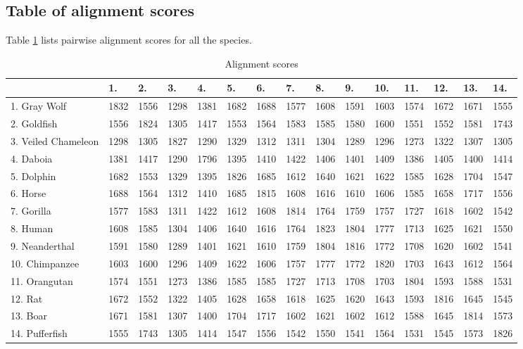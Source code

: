 \documentclass[a4paper,11pt]{article}
\begin{document}
\subsection{Table of alignment scores}
Table \ref{scores} lists pairwise alignment scores for all the species.
\begin{table}[htbp,resetmargins=true]
\footnotesize
\caption{Alignment scores}
\label{scores}
\begin{center}
\begin{tabular}{@{}lllllllllllllll@{}}
\hline
 & 1.  & 2.  & 3.  & 4.  & 5.  & 6.  & 7.  & 8.  & 9.  & 10.  & 11.  & 12.  & 13.  & 14.\\
\hline

1. Gray Wolf & 1832 & 1556 & 1298 & 1381 & 1682 & 1688 & 1577 & 1608 & 1591 & 1603 & 1574 & 1672 & 1671 & 1555\\
2. Goldfish & 1556 & 1824 & 1305 & 1417 & 1553 & 1564 & 1583 & 1585 & 1580 & 1600 & 1551 & 1552 & 1581 & 1743\\
3. Veiled Chameleon & 1298 & 1305 & 1827 & 1290 & 1329 & 1312 & 1311 & 1304 & 1289 & 1296 & 1273 & 1322 & 1307 & 1305\\
4. Daboia & 1381 & 1417 & 1290 & 1796 & 1395 & 1410 & 1422 & 1406 & 1401 & 1409 & 1386 & 1405 & 1400 & 1414\\
5. Dolphin & 1682 & 1553 & 1329 & 1395 & 1826 & 1685 & 1612 & 1640 & 1621 & 1622 & 1585 & 1628 & 1704 & 1547\\
6. Horse & 1688 & 1564 & 1312 & 1410 & 1685 & 1815 & 1608 & 1616 & 1610 & 1606 & 1585 & 1658 & 1717 & 1556\\
7. Gorilla & 1577 & 1583 & 1311 & 1422 & 1612 & 1608 & 1814 & 1764 & 1759 & 1757 & 1727 & 1618 & 1602 & 1542\\
8. Human & 1608 & 1585 & 1304 & 1406 & 1640 & 1616 & 1764 & 1823 & 1804 & 1777 & 1713 & 1625 & 1621 & 1550\\
9. Neanderthal & 1591 & 1580 & 1289 & 1401 & 1621 & 1610 & 1759 & 1804 & 1816 & 1772 & 1708 & 1620 & 1602 & 1541\\
10. Chimpanzee & 1603 & 1600 & 1296 & 1409 & 1622 & 1606 & 1757 & 1777 & 1772 & 1820 & 1703 & 1643 & 1612 & 1564\\
11. Orangutan & 1574 & 1551 & 1273 & 1386 & 1585 & 1585 & 1727 & 1713 & 1708 & 1703 & 1804 & 1593 & 1588 & 1531\\
12. Rat & 1672 & 1552 & 1322 & 1405 & 1628 & 1658 & 1618 & 1625 & 1620 & 1643 & 1593 & 1816 & 1645 & 1545\\
13. Boar & 1671 & 1581 & 1307 & 1400 & 1704 & 1717 & 1602 & 1621 & 1602 & 1612 & 1588 & 1645 & 1814 & 1573\\
14. Pufferfish & 1555 & 1743 & 1305 & 1414 & 1547 & 1556 & 1542 & 1550 & 1541 & 1564 & 1531 & 1545 & 1573 & 1826\\

\hline
\end{tabular}
\end{center}
\end{table}
\end{document}
